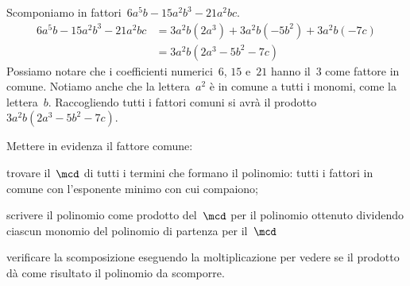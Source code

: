 \begin{exrig}
 \begin{esempio}
Scomponiamo in fattori~$6a^{5}b-15a^{2}b^{3}-21a^{2}bc$.
 \begin{equation*}
   \begin{split}
    6a^{5}b-15a^{2}b^{3}-21a^{2}bc 
    &=3a^{2}b(2a^{3})+3a^{2}b(-5b^{2})+3a^{2}b(-7c)\\
    &=3a^{2}b\left(2a^{3}-5b^{2}-7c\right)
   \end{split}
 \end{equation*}
Possiamo notare che i coefficienti numerici~$6$, $15$ e~$21$ hanno il~$3$ 
come fattore in comune.
Notiamo anche che la lettera~$a^{2}$ è in comune a tutti i monomi, come la 
lettera~$b$. 
Raccogliendo tutti i fattori comuni si avrà il prodotto
$3a^{2}b\left(2a^{3}-5b^{2}-7c\right)$.
 \end{esempio}
\end{exrig}

\begin{procedura}
Mettere in evidenza il fattore comune:
\begin{enumeratea}
\item trovare il~$\mcd$ di tutti i termini che formano il polinomio: tutti i 
 fattori in comune con l'esponente minimo con cui compaiono;
\item scrivere il polinomio come prodotto del~$\mcd$ per il polinomio ottenuto 
 dividendo ciascun monomio del polinomio di partenza per il~$\mcd$
\item verificare la scomposizione eseguendo la moltiplicazione per vedere se 
 il prodotto dà come risultato il polinomio da scomporre.
\end{enumeratea}
\end{procedura}

